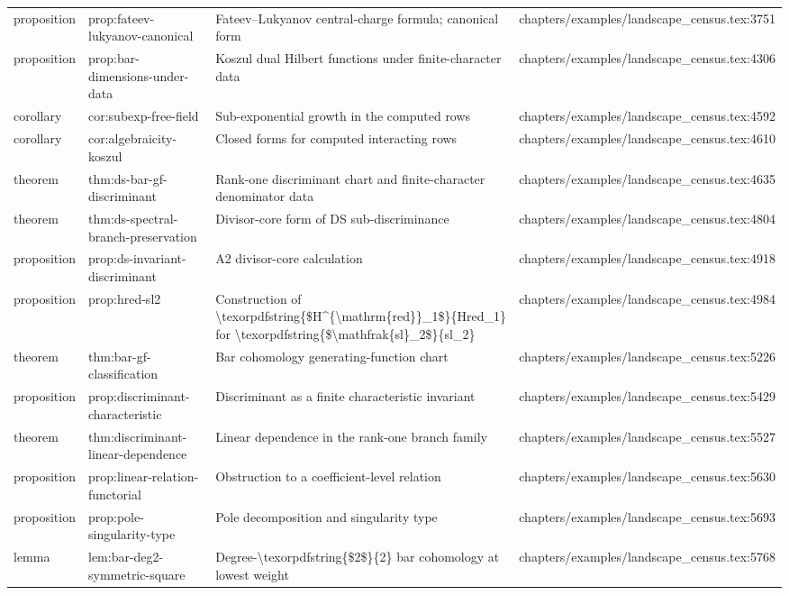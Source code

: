 \documentclass[11pt]{article}
\begin{document}
\begin{longtable}{L{0.10\textwidth}L{0.26\textwidth}L{0.42\textwidth}L{0.22\textwidth}}
proposition & prop:fateev-lukyanov-canonical & Fateev--Lukyanov central-charge formula; canonical form & chapters/examples/landscape\_census.tex:3751\\
proposition & prop:bar-dimensions-under-data & Koszul dual Hilbert functions under finite-character data & chapters/examples/landscape\_census.tex:4306\\
corollary & cor:subexp-free-field & Sub-exponential growth in the computed rows & chapters/examples/landscape\_census.tex:4592\\
corollary & cor:algebraicity-koszul & Closed forms for computed interacting rows & chapters/examples/landscape\_census.tex:4610\\
theorem & thm:ds-bar-gf-discriminant & Rank-one discriminant chart and finite-character denominator data & chapters/examples/landscape\_census.tex:4635\\
theorem & thm:ds-spectral-branch-preservation & Divisor-core form of DS sub-discriminance & chapters/examples/landscape\_census.tex:4804\\
proposition & prop:ds-invariant-discriminant & A2 divisor-core calculation & chapters/examples/landscape\_census.tex:4918\\
proposition & prop:hred-sl2 & Construction of \textbackslash{}texorpdfstring\{\$H\textasciicircum{}\{\textbackslash{}mathrm\{red\}\}\_1\$\}\{Hred\_1\} for \textbackslash{}texorpdfstring\{\$\textbackslash{}mathfrak\{sl\}\_2\$\}\{sl\_2\} & chapters/examples/landscape\_census.tex:4984\\
theorem & thm:bar-gf-classification & Bar cohomology generating-function chart & chapters/examples/landscape\_census.tex:5226\\
proposition & prop:discriminant-characteristic & Discriminant as a finite characteristic invariant & chapters/examples/landscape\_census.tex:5429\\
theorem & thm:discriminant-linear-dependence & Linear dependence in the rank-one branch family & chapters/examples/landscape\_census.tex:5527\\
proposition & prop:linear-relation-functorial & Obstruction to a coefficient-level relation & chapters/examples/landscape\_census.tex:5630\\
proposition & prop:pole-singularity-type & Pole decomposition and singularity type & chapters/examples/landscape\_census.tex:5693\\
lemma & lem:bar-deg2-symmetric-square & Degree-\textbackslash{}texorpdfstring\{\$2\$\}\{2\} bar cohomology at lowest weight & chapters/examples/landscape\_census.tex:5768\\

\end{longtable}
\end{document}
